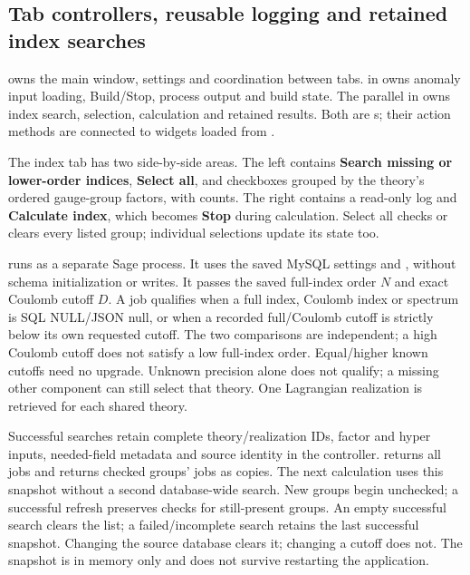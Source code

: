 \clearpage
\subsection{Tab controllers, reusable logging and retained index searches}
\label{sec:index-gui}
 owns the main window, settings and coordination between
tabs.  in  owns anomaly
input loading, Build/Stop, process output and build state. The parallel
 in  owns index search,
selection, calculation and retained results. Both are s;
their action methods are connected to widgets loaded from .

The index tab has two side-by-side areas. The left contains
\textbf{Search missing or lower-order indices}, \textbf{Select all}, and
checkboxes grouped by the theory's ordered gauge-group factors, with counts.
The right contains a read-only log and \textbf{Calculate index}, which becomes
\textbf{Stop} during calculation. Select all checks or clears every listed
group; individual selections update its state too.

 runs as a separate Sage process. It uses the saved
MySQL settings and , without
schema initialization or writes. It passes the saved full-index order $N$
and exact Coulomb cutoff $D$. A job qualifies when a full index, Coulomb
index or spectrum is SQL NULL/JSON null, or when a recorded full/Coulomb
cutoff is strictly below its own requested cutoff. The two comparisons are
independent; a high Coulomb cutoff does not satisfy a low full-index order.
Equal/higher known cutoffs need no upgrade. Unknown precision alone does not
qualify; a missing other component can still select that theory.
One Lagrangian realization is retrieved for each shared theory.

Successful searches retain complete theory/realization IDs, factor and hyper
inputs, needed-field metadata and source identity in the controller.
 returns all jobs and  returns checked
groups' jobs as copies. The next calculation uses this snapshot without a
second database-wide search. New groups begin unchecked; a successful refresh
preserves checks for still-present groups. An empty successful search clears
the list; a failed/incomplete search retains the last successful snapshot.
Changing the source database clears it; changing a cutoff does not. The
snapshot is in memory only and does not survive restarting the application.

